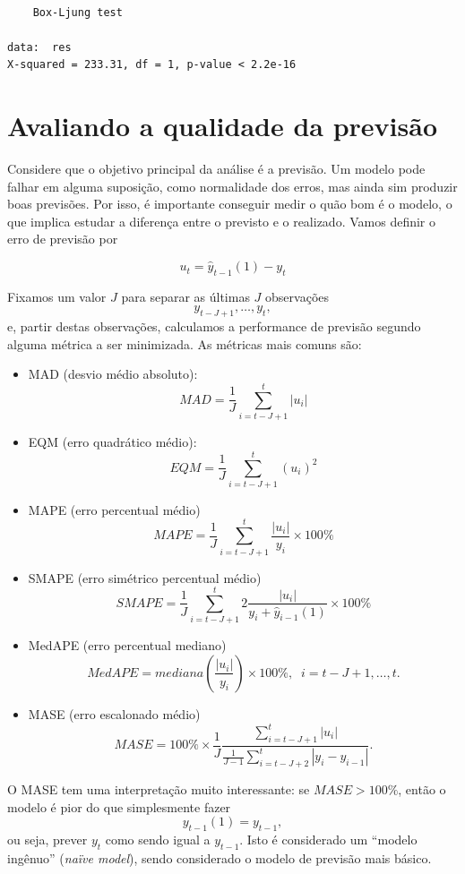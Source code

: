 \documentclass[
  letterpaper,
  DIV=11,
  numbers=noendperiod]{scrartcl}
\providecommand{\tightlist}{%
  \setlength{\itemsep}{0pt}\setlength{\parskip}{0pt}}\usepackage{longtable,booktabs,array}
\theoremstyle{plain}
\theoremstyle{plain}
\theoremstyle{definition}
\theoremstyle{definition}
\theoremstyle{remark}
\begin{document}
\begin{verbatim}

    Box-Ljung test

data:  res
X-squared = 233.31, df = 1, p-value < 2.2e-16
\end{verbatim}

\hypertarget{avaliando-a-qualidade-da-previsuxe3o}{%
\section{Avaliando a qualidade da
previsão}\label{avaliando-a-qualidade-da-previsuxe3o}}

Considere que o objetivo principal da análise é a previsão. Um modelo
pode falhar em alguma suposição, como normalidade dos erros, mas ainda
sim produzir boas previsões. Por isso, é importante conseguir medir o
quão bom é o modelo, o que implica estudar a diferença entre o previsto
e o realizado. Vamos definir o erro de previsão por

\[u_{t} =\hat{y}_{t-1}(1)-y_{t}\]

Fixamos um valor \(J\) para separar as últimas \(J\) observações
\[y_{t-J+1},\ldots,y_{t},\] e, partir destas observações, calculamos a
performance de previsão segundo alguma métrica a ser minimizada. As
métricas mais comuns são:

\begin{itemize}
\tightlist
\item
  MAD (desvio médio absoluto):
  \[MAD = \frac{1}{J}\sum_{i=t-J+1}^t |u_i|\]
\item
  EQM (erro quadrático médio):
  \[EQM = \frac{1}{J}\sum_{i=t-J+1}^t (u_i)^2\]
\item
  MAPE (erro percentual médio)
  \[MAPE = \frac{1}{J}\sum_{i=t-J+1}^t \frac{|u_i|}{y_i}\times 100\%\]
\item
  SMAPE (erro simétrico percentual médio)
  \[SMAPE = \frac{1}{J}\sum_{i=t-J+1}^t 2\frac{|u_i|}{y_i+\hat{y}_{i-1}(1)}\times 100\%\]
\item
  MedAPE (erro percentual mediano)
  \[MedAPE = mediana\left(\frac{|u_i|}{y_i}\right) \times 100\%,\;\;i=t-J+1,\ldots,t.\]
\item
  MASE (erro escalonado médio)
  \[MASE = 100\%\times\frac{1}{J} \frac{\sum_{i = t-J+1}^t|u_i|}{\frac{1}{J-1}\sum_{i=t-J+2}^t |y_i - y_{i-1}|}.\]
\end{itemize}

O MASE tem uma interpretação muito interessante: se \(MASE>100\%\),
então o modelo é pior do que simplesmente fazer \[y_{t-1}(1)=y_{t-1},\]
ou seja, prever \(y_t\) como sendo igual a \(y_{t-1}\). Isto é
considerado um ``modelo ingênuo'' (\emph{naïve model}), sendo
considerado o modelo de previsão mais básico.
\end{document}
